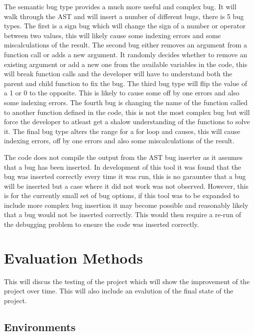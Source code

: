\documentclass[12pt]{extarticle}
\begin{document}
The semantic bug type provides a much more useful and complex bug. It will walk through the AST and will insert a number of different bugs, there is 5 bug types. The first is a sign bug which will change the sign of a number or operator between two values, this will likely cause some indexing errors and some miscalculations of the result. The second bug either removes an argument from a function call or adds a new argument. It randomly decides whether to remove an existing argument or add a new one from the available variables in the code, this will break function calls and the developer will have to understand both the parent and child function to fix the bug. The third bug type will flip the value of a 1 or 0 to the opposite. This is likely to cause some off by one errors and also some indexing errors. The fourth bug is changing the name of the function called to another function defined in the code, this is not the most complex bug but will force the developer to atleast get a shalow understanding of the functions to solve it. The final bug type alters the range for a for loop and causes, this will cause indexing errors, off by one errors and also some miscalculations of the result.

The code does not compile the output from the AST bug inserter as it assumes that a bug has been inserted. In development of this tool it was found that the bug was inserted correctly every time it was run, this is no garauntee that a bug will be inserted but a case where it did not work was not observed. However, this is for the currently small set of bug options, if this tool was to be expanded to include more complex bug insertion it may become possible and reasonably likely that a bug would not be inserted correctly. This would then require a re-run of the debugging problem to ensure the code was inserted correctly.

\newpage
\section{Evaluation Methods}

This will discus the testing of the project which will show the improvement of the project over time. This will also include an evalution of the final state of the project.

\subsection{Environments}
\end{document}
